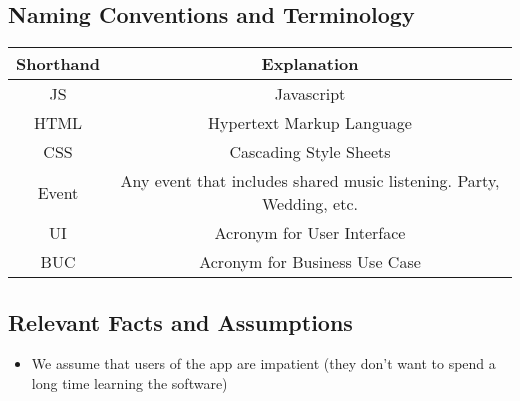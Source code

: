 \documentclass[12pt, titlepage]{article}
\begin{document}
\subsection{Naming Conventions and Terminology}

\begin{table}[H]
\centering
\begin{tabular}{ c | c }
\textbf{Shorthand} & \textbf{Explanation}\\ \hline
JS & Javascript\\
HTML & Hypertext Markup Language\\
CSS & Cascading Style Sheets\\
Event & Any event that includes shared music listening. Party, Wedding, etc. \\
UI & Acronym for User Interface\\
BUC & Acronym for Business Use Case
\end{tabular}
\end{table}
\subsection{Relevant Facts and Assumptions}

\begin{itemize}
\item We assume that users of the app are impatient (they don't want to spend a
long time learning the software)
\end{itemize}
\end{document}
